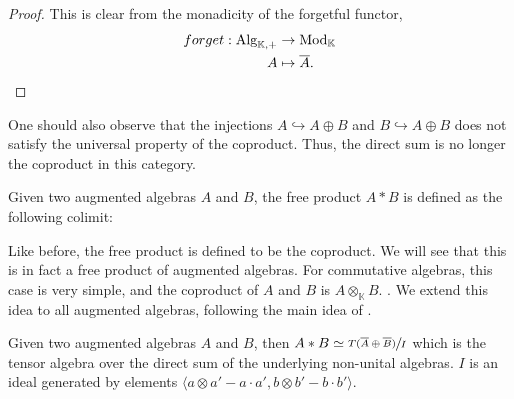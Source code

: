 \documentclass[../thesis.tex]{subfiles}
\begin{document}
                \begin{proof}
                    This is clear from the monadicity of the forgetful functor,
                    \begin{align*}
                        forget : \tt{Alg}_{\mathbb{K},+} & \rightarrow \tt{Mod}_{\mathbb{K}} \\
                        A & \mapsto \overline{A}\tt{.}
                    \end{align*}
                \end{proof}

                One should also observe that the injections $A \hookrightarrow A \oplus B$ and $B \hookrightarrow A \oplus B$ does not satisfy the universal property of the coproduct. Thus, the direct sum is no longer the coproduct in this category.

                \begin{definition}
                    Given two augmented algebras $A$ and $B$, the free product $A\ast B$ is defined as the following colimit:
                    \begin{center}
                    \end{center}
                \end{definition}
                
                Like before, the free product is defined to be the coproduct. We will see that this is in fact a free product of augmented algebras. For commutative algebras, this case is very simple, and the coproduct of $A$ and $B$ is $A \otimes_{\mathbb{K}}B$. . We extend this idea to all augmented algebras, following the main idea of \cite{Aambø21}.

                \begin{lemma}
                    Given two augmented algebras $A$ and $B$, then $A\ast B \simeq \sfrac{T(\overline{A}\oplus \overline{B})}{I}$ which is the tensor algebra over the direct sum of the underlying non-unital algebras. $I$ is an ideal generated by elements $\langle a\otimes a' - a\cdot a',b\otimes b' - b\cdot b' \rangle$.
                \end{lemma}
\end{document}
